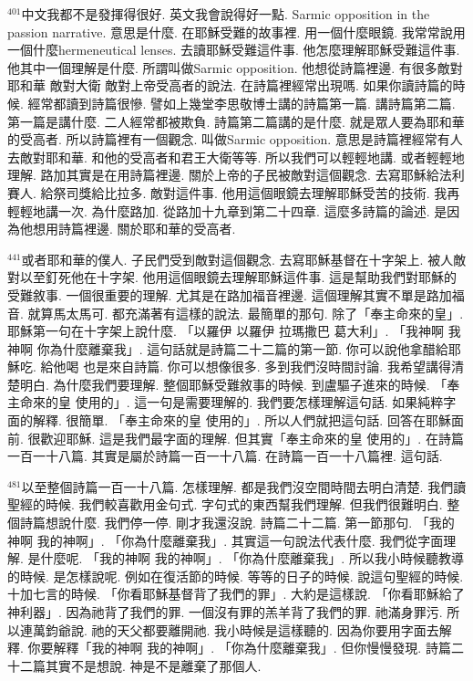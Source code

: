 \documentclass{book}
\begin{document}
$^{401}$中文我都不是發揮得很好.
英文我會說得好一點.
Sarmic opposition in the passion narrative.
意思是什麼.
在耶穌受難的故事裡.
用一個什麼眼鏡.
我常常說用一個什麼hermeneutical lenses.
去讀耶穌受難這件事.
他怎麼理解耶穌受難這件事.
他其中一個理解是什麼.
所謂叫做Sarmic opposition.
他想從詩篇裡邊.
有很多敵對耶和華 敵對大衛 敵對上帝受高者的說法.
在詩篇裡經常出現嗎.
如果你讀詩篇的時候.
經常都讀到詩篇很慘.
譬如上幾堂李思敬博士講的詩篇第一篇.
講詩篇第二篇.
第一篇是講什麼.
二人經常都被欺負.
詩篇第二篇講的是什麼.
就是眾人要為耶和華的受高者.
所以詩篇裡有一個觀念.
叫做Sarmic opposition.
意思是詩篇裡經常有人去敵對耶和華.
和他的受高者和君王大衛等等.
所以我們可以輕輕地講.
或者輕輕地理解.
路加其實是在用詩篇裡邊.
關於上帝的子民被敵對這個觀念.
去寫耶穌給法利賽人.
給祭司獎給比拉多.
敵對這件事.
他用這個眼鏡去理解耶穌受苦的技術.
我再輕輕地講一次.
為什麼路加.
從路加十九章到第二十四章.
這麼多詩篇的論述.
是因為他想用詩篇裡邊.
關於耶和華的受高者.

$^{441}$或者耶和華的僕人.
子民們受到敵對這個觀念.
去寫耶穌基督在十字架上.
被人敵對以至釘死他在十字架.
他用這個眼鏡去理解耶穌這件事.
這是幫助我們對耶穌的受難敘事.
一個很重要的理解.
尤其是在路加福音裡邊.
這個理解其實不單是路加福音.
就算馬太馬可.
都充滿著有這樣的說法.
最簡單的那句.
除了「奉主命來的皇」.
耶穌第一句在十字架上說什麼.
「以羅伊 以羅伊 拉瑪撒巴 葛大利」.
「我神啊 我神啊 你為什麼離棄我」.
這句話就是詩篇二十二篇的第一節.
你可以說他拿醋給耶穌吃.
給他喝 也是來自詩篇.
你可以想像很多.
多到我們沒時間討論.
我希望講得清楚明白.
為什麼我們要理解.
整個耶穌受難敘事的時候.
到盧驅子進來的時候.
「奉主命來的皇 使用的」.
這一句是需要理解的.
我們要怎樣理解這句話.
如果純粹字面的解釋.
很簡單.
「奉主命來的皇 使用的」.
所以人們就把這句話.
回答在耶穌面前.
很歡迎耶穌.
這是我們最字面的理解.
但其實「奉主命來的皇 使用的」.
在詩篇一百一十八篇.
其實是屬於詩篇一百一十八篇.
在詩篇一百一十八篇裡.
這句話.

$^{481}$以至整個詩篇一百一十八篇.
怎樣理解.
都是我們沒空間時間去明白清楚.
我們讀聖經的時候.
我們較喜歡用金句式.
字句式的東西幫我們理解.
但我們很難明白.
整個詩篇想說什麼.
我們停一停.
剛才我還沒說.
詩篇二十二篇.
第一節那句.
「我的神啊 我的神啊」.
「你為什麼離棄我」.
其實這一句說法代表什麼.
我們從字面理解.
是什麼呢.
「我的神啊 我的神啊」.
「你為什麼離棄我」.
所以我小時候聽教導的時候.
是怎樣說呢.
例如在復活節的時候.
等等的日子的時候.
說這句聖經的時候.
十加七言的時候.
「你看耶穌基督背了我們的罪」.
大約是這樣說.
「你看耶穌給了神利器」.
因為祂背了我們的罪.
一個沒有罪的羔羊背了我們的罪.
祂滿身罪污.
所以連萬鈞爺說.
祂的天父都要離開祂.
我小時候是這樣聽的.
因為你要用字面去解釋.
你要解釋「我的神啊 我的神啊」.
「你為什麼離棄我」.
但你慢慢發現.
詩篇二十二篇其實不是想說.
神是不是離棄了那個人.
\end{document}
